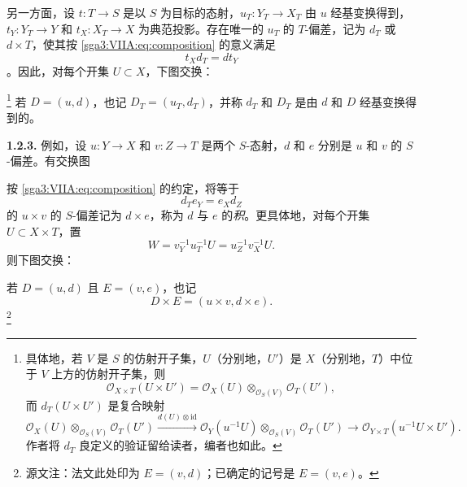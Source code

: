 另一方面，设 \(t:T\to S\) 是以 \(S\) 为目标的态射，\(u_T:Y_T\to X_T\) 由 \(u\) 经基变换得到，\(t_Y:Y_T\to Y\) 和 \(t_X:X_T\to X\) 为典范投影。存在唯一的 \(u_T\) 的 \(T\)-偏差，记为 \(d_T\) 或 \(d\times T\)，使其按 \eqref{sga3:VIIA:eq:composition} 的意义满足
\[
  t_Xd_T=dt_Y
\]
。因此，对每个开集 \(U\subset X\)，下图交换：
\begin{center}
  \label{sga3:VIIA:1.2.2-base-change-square}
  
\end{center}
\footnote{具体地，若 \(V\) 是 \(S\) 的仿射开子集，\(U\)（分别地，\(U'\)）是 \(X\)（分别地，\(T\)）中位于 \(V\) 上方的仿射开子集，则
\[
 \mathcal O_{X\times T}(U\times U')
 =\mathcal O_X(U)\otimes_{\mathcal O_S(V)}\mathcal O_T(U'),
\]
而 \(d_T(U\times U')\) 是复合映射
\[
 \mathcal O_X(U)\otimes_{\mathcal O_S(V)}\mathcal O_T(U')
 \xrightarrow{d(U)\otimes\mathrm{id}}
 \mathcal O_Y(u^{-1}U)\otimes_{\mathcal O_S(V)}\mathcal O_T(U')
 \longrightarrow
 \mathcal O_{Y\times T}(u^{-1}U\times U').
\]
作者将 \(d_T\) 良定义的验证留给读者，编者也如此。}
若 \(D=(u,d)\)，也记 \(D_T=(u_T,d_T)\)，并称 \(d_T\) 和 \(D_T\) 是由 \(d\) 和 \(D\) 经基变换得到的。

\medskip
\noindent\textbf{1.2.3.}
\label{sga3:VIIA:1.2.3}
例如，设 \(u:Y\to X\) 和 \(v:Z\to T\) 是两个 \(S\)-态射，\(d\) 和 \(e\) 分别是 \(u\) 和 \(v\) 的 \(S\)-偏差。有交换图
\begin{center}
  \label{sga3:VIIA:1.2.3-product-scheme-square}
  
\end{center}
按 \eqref{sga3:VIIA:eq:composition} 的约定，将等于
\[
  d_Te_Y=e_Xd_Z
\]
的 \(u\times v\) 的 \(S\)-偏差记为 \(d\times e\)，称为 \(d\) 与 \(e\) 的\emph{积}。更具体地，对每个开集 \(U\subset X\times T\)，置
\[
  W=v_Y^{-1}u_T^{-1}U=u_Z^{-1}v_X^{-1}U.
\]
则下图交换：
\begin{center}
  \label{sga3:VIIA:1.2.3-product-deviation-square}
  
\end{center}
若 \(D=(u,d)\) 且 \(E=(v,e)\)，也记
\[
  D\times E=(u\times v,d\times e).
\]
\footnote{源文注：法文此处印为 \(E=(v,d)\)；已确定的记号是 \(E=(v,e)\)。}

